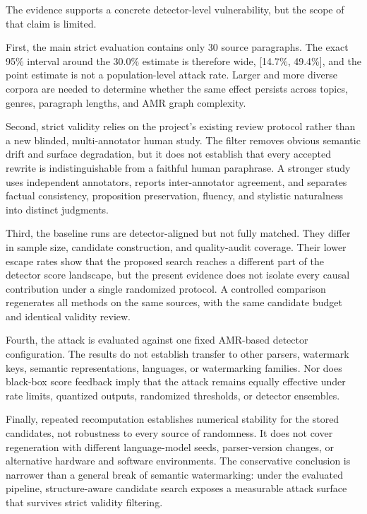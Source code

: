 The evidence supports a concrete detector-level vulnerability, but the scope of that claim is limited.

First, the main strict evaluation contains only 30 source paragraphs. The exact 95\% interval around the 30.0\% estimate is therefore wide, [14.7\%, 49.4\%], and the point estimate is not a population-level attack rate. Larger and more diverse corpora are needed to determine whether the same effect persists across topics, genres, paragraph lengths, and AMR graph complexity.

Second, strict validity relies on the project's existing review protocol rather than a new blinded, multi-annotator human study. The filter removes obvious semantic drift and surface degradation, but it does not establish that every accepted rewrite is indistinguishable from a faithful human paraphrase. A stronger study uses independent annotators, reports inter-annotator agreement, and separates factual consistency, proposition preservation, fluency, and stylistic naturalness into distinct judgments.

Third, the baseline runs are detector-aligned but not fully matched. They differ in sample size, candidate construction, and quality-audit coverage. Their lower escape rates show that the proposed search reaches a different part of the detector score landscape, but the present evidence does not isolate every causal contribution under a single randomized protocol. A controlled comparison regenerates all methods on the same sources, with the same candidate budget and identical validity review.

Fourth, the attack is evaluated against one fixed AMR-based detector configuration. The results do not establish transfer to other parsers, watermark keys, semantic representations, languages, or watermarking families. Nor does black-box score feedback imply that the attack remains equally effective under rate limits, quantized outputs, randomized thresholds, or detector ensembles.

Finally, repeated recomputation establishes numerical stability for the stored candidates, not robustness to every source of randomness. It does not cover regeneration with different language-model seeds, parser-version changes, or alternative hardware and software environments. The conservative conclusion is narrower than a general break of semantic watermarking: under the evaluated pipeline, structure-aware candidate search exposes a measurable attack surface that survives strict validity filtering.

